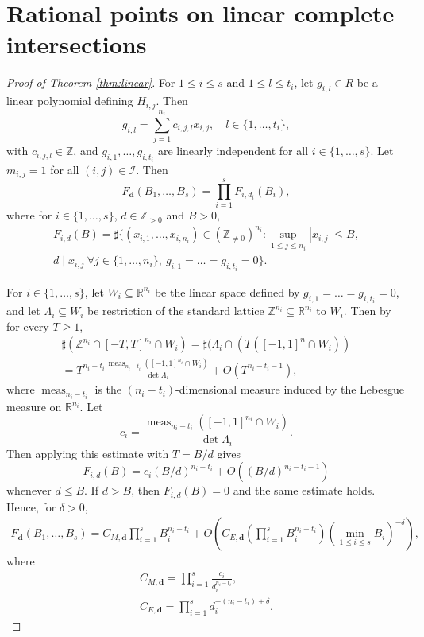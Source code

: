 \documentclass[10pt, a4paper, reqno, english]{amsart}
\newcommand\ZZ{\mathbb{Z}}
\newcommand\RR{\mathbb{R}}
\newcommand{\indexset}{{\mathcal I}} %
\DeclareMathOperator{\meas}{meas} %
\theoremstyle{definition}
\numberwithin{theorem}{section}
\numberwithin{equation}{section}
\begin{document}
\section{Rational points on linear complete intersections}	 
\label{sec:linear}
\begin{proof}[Proof of Theorem \ref{thm:linear}]
For $1\leq i\leq s$ and $1\leq l\leq t_i$, let $g_{i,l}\in R$ be a linear polynomial defining $H_{i,j}$. 
Then
$$
g_{i,l}=\sum_{j=1}^{n_i} c_{i,j,l}x_{i,j}, \quad l\in\{1,\dots,t_i\},
$$
with $c_{i,j,l}\in\ZZ$, and $g_{i,1},\dots,g_{i,t_i}$ are linearly independent for all $i\in\{1,\dots,s\}$.
Let $m_{i,j}=1$ for all $(i,j)\in\indexset$.
Then 
	$$ F_{\mathbf d}(B_1,\dots,B_s)
	=\prod_{i=1}^sF_{i,d_i}(B_i),
	$$
	where for $i\in\{1,\dots,s\}$, $d\in\ZZ_{>0}$ and $B>0$,
	\begin{multline*}
	F_{i,d}(B)=\sharp\{(x_{i,1},\dots,x_{i,n_i})\in(\ZZ_{\neq 0})^{n_i}: 
	 \sup_{1\leq j\leq n_{i}}|x_{i,j}|\leq B, \\
	 d\mid x_{i,j}  \ \forall j\in\{1,\dots,n_i\}, \
	  g_{i,1}=\dots=g_{i,t_i}=0\}.
	 \end{multline*}

For $i\in\{1,\dots,s\}$, let $W_i\subseteq \RR^{n_i}$ be the linear space defined by $g_{i,1}=\dots=g_{i,t_i}=0$, and let $\Lambda_i\subseteq W_i$ be restriction of the standard lattice $\ZZ^{n_i}\subseteq\RR^{n_i}$ to $W_i$. Then by \cite[Lemma 11.10.15]{BombieriGubler} for every $T\geq 1$,
\begin{gather*}
\sharp (\ZZ^{n_i}\cap[-T,T]^{n_i}\cap W_i)=\sharp (\Lambda_i\cap(T([-1,1]^n\cap W_i)) \\
=T^{n_i-t_i}\frac{\meas_{n_i-t_i}([-1,1]^{n_i}\cap W_i)}{\det\Lambda_i} +O\left(T^{n_i-t_i-1} \right),
\end{gather*}
where $\meas_{n_i-t_i}$ is the $(n_i-t_i)$-dimensional measure induced by the Lebesgue measure on $\RR^{n_i}$. 
Let
$$
c_i=\frac{\meas_{n_i-t_i}([-1,1]^{n_i}\cap W_i)}{\det\Lambda_i}.
$$
Then applying this estimate with $T=B/d$ gives
$$F_{i,d}(B)=c_i(B/d)^{n_i-t_i} +O((B/d)^{n_i-t_i-1})$$ 
whenever $d\leq B$. If $d>B$, then $F_{i,d}(B)=0$ and the same estimate holds.
Hence, for $\delta>0$,
\begin{multline*}
F_{\mathbf d}(B_1,\dots,B_s)=C_{M,\mathbf d} \prod_{i=1}^sB_i^{n_i-t_i} 
+O\left( C_{E,\mathbf d}\left(\prod_{i=1}^sB_i^{n_i-t_i}\right)\left(\min_{1\leq i\leq s}B_i\right)^{-\delta}\right),
\end{multline*}
where
\begin{gather}
\label{eq:linear C_M}
C_{M,\mathbf d}=\prod_{i=1}^s\frac{c_i}{d_i^{n_i-t_i}},\\
C_{E,\mathbf d}=\prod_{i=1}^sd_i^{-(n_i-t_i)+\delta}.
\end{gather}


\end{proof}
\end{document}
